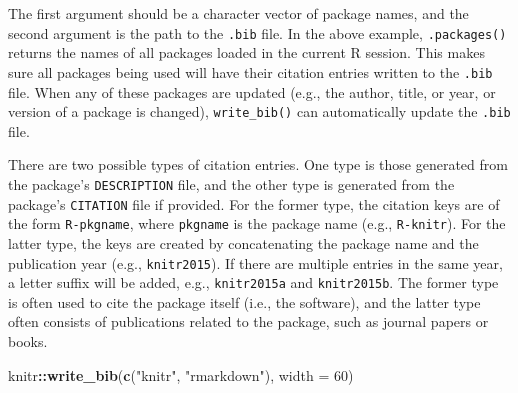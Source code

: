 \documentclass[
  11pt,
]{krantz}
\newenvironment{Shaded}{\begin{snugshade}}{\end{snugshade}}
\newcommand{\DataTypeTok}[1]{\textcolor[rgb]{0.27,0.27,0.27}{#1}}
\newcommand{\DecValTok}[1]{\textcolor[rgb]{0.06,0.06,0.06}{#1}}
\newcommand{\KeywordTok}[1]{\textcolor[rgb]{0.27,0.27,0.27}{\textbf{#1}}}
\newcommand{\NormalTok}[1]{#1}
\newcommand{\OperatorTok}[1]{\textcolor[rgb]{0.43,0.43,0.43}{\textbf{#1}}}
\newcommand{\StringTok}[1]{\textcolor[rgb]{0.5,0.5,0.5}{#1}}
\begin{document}
The first argument should be a character vector of package names, and the second argument is the path to the \texttt{.bib} file. In the above example, \texttt{.packages()} returns the names of all packages loaded in the current R session. This makes sure all packages being used will have their citation entries written to the \texttt{.bib} file. When any of these packages are updated (e.g., the author, title, or year, or version of a package is changed), \texttt{write\_bib()} can automatically update the \texttt{.bib} file.

There are two possible types of citation entries. One type is those generated from the package's \texttt{DESCRIPTION} file, and the other type is generated from the package's \texttt{CITATION} file if provided. For the former type, the citation keys are of the form \texttt{R-pkgname}, where \texttt{pkgname} is the package name (e.g., \texttt{R-knitr}). For the latter type, the keys are created by concatenating the package name and the publication year (e.g., \texttt{knitr2015}). If there are multiple entries in the same year, a letter suffix will be added, e.g., \texttt{knitr2015a} and \texttt{knitr2015b}. The former type is often used to cite the package itself (i.e., the software), and the latter type often consists of publications related to the package, such as journal papers or books.

\begin{Shaded}
\begin{Highlighting}[]
\NormalTok{knitr}\OperatorTok{::}\KeywordTok{write_bib}\NormalTok{(}\KeywordTok{c}\NormalTok{(}\StringTok{"knitr"}\NormalTok{, }\StringTok{"rmarkdown"}\NormalTok{), }\DataTypeTok{width =} \DecValTok{60}\NormalTok{)}
\end{Highlighting}
\end{Shaded}
\end{document}
